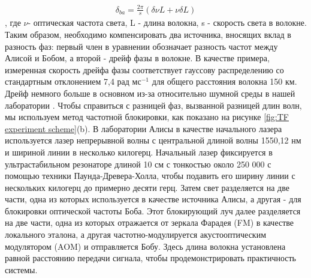 \begin{align}
    \delta_{ba} = \frac{2\pi}{s}(\delta\nu L + \nu\delta L)
\end{align}\label{eq: TF phase fluct lit},
 где $\nu$- оптическая частота света, L - длина волокна, s - скорость света в волокне. Таким образом, необходимо компенсировать два источника, вносящих вклад в разность фаз: первый член в уравнении обозначает разность частот между Алисой и Бобом, а второй - дрейф фазы в волокне. В качестве примера, измеренная скорость дрейфа фазы соответствует гауссову распределению со стандартным отклонением 7,4 рад $мс^{-1}$ для общего расстояния волокна 150 км. Дрейф немного больше в основном из-за относительно шумной среды в нашей лаборатории . Чтобы справиться с разницей фаз, вызванной разницей длин волн, мы используем метод частотной блокировки, как показано на рисунке \ref{fig:TF experiment scheme}(b). В лаборатории Алисы в качестве начального лазера используется лазер непрерывной волны с центральной длиной волны 1550,12 нм и шириной линии в несколько килогерц. Начальный лазер фиксируется в ультрастабильном резонаторе длиной 10 см с тонкостью около 250 000 с помощью техники Паунда-Древера-Холла, чтобы подавить его ширину линии с нескольких килогерц до примерно десяти герц. Затем свет разделяется на две части, одна из которых используется в качестве источника Алисы, а другая - для блокировки оптической частоты Боба. Этот блокирующий луч далее разделяется на две части, одна из которых отражается от зеркала Фарадея (FM) в качестве локального эталона, а другая частотно-модулируется акустооптическим модулятором (AOM) и отправляется Бобу. Здесь длина волокна установлена равной расстоянию передачи сигнала, чтобы продемонстрировать практичность системы.

